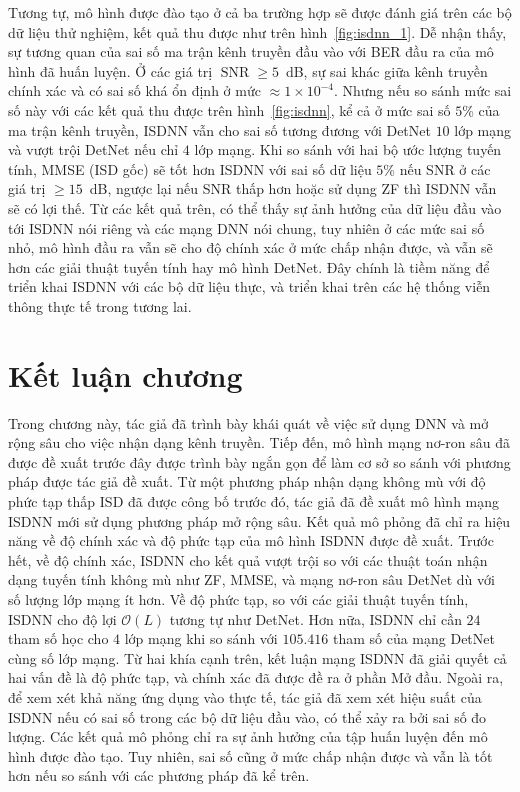 Tương tự, mô hình được đào tạo ở cả ba trường hợp sẽ được đánh giá trên các bộ dữ liệu thử nghiệm, kết quả thu được như trên hình~\ref{fig:isdnn_1}. Dễ nhận thấy, sự tương quan của sai số ma trận kênh truyền đầu vào với BER đầu ra của mô hình đã huấn luyện. Ở các giá trị $\operatorname{SNR}\ge 5$~dB, sự sai khác giữa kênh truyền chính xác và có sai số khá ổn định ở mức $\approx 1 \times 10^{-4}$. Nhưng nếu so sánh mức sai số này với các kết quả thu được trên hình~\ref{fig:isdnn}, kể cả ở mức sai số $5$\% của ma trận kênh truyền, ISDNN vẫn cho sai số tương đương với DetNet $10$ lớp mạng và vượt trội DetNet nếu chỉ $4$ lớp mạng. Khi so sánh với hai bộ ước lượng tuyến tính, MMSE (ISD gốc) sẽ tốt hơn ISDNN với sai số dữ liệu $5$\% nếu SNR ở các giá trị $\ge 15$~dB, ngược lại nếu SNR thấp hơn hoặc sử dụng ZF thì ISDNN vẫn sẽ có lợi thế. Từ các kết quả trên, có thể thấy sự ảnh hưởng của dữ liệu đầu vào tới ISDNN nói riêng và các mạng DNN nói chung, tuy nhiên ở các mức sai số nhỏ, mô hình đầu ra vẫn sẽ cho độ chính xác ở mức chấp nhận được, và vẫn sẽ hơn các giải thuật tuyến tính hay mô hình DetNet. Đây chính là tiềm năng để triển khai ISDNN với các bộ dữ liệu thực, và triển khai trên các hệ thống viễn thông thực tế trong tương lai.

\section{Kết luận chương}

Trong chương này, tác giả đã trình bày khái quát về việc sử dụng DNN và mở rộng sâu cho việc nhận dạng kênh truyền. Tiếp đến, mô hình mạng nơ-ron sâu đã được đề xuất trước đây được trình bày ngắn gọn để làm cơ sở so sánh với phương pháp được tác giả đề xuất. Từ một phương pháp nhận dạng không mù với độ phức tạp thấp ISD đã được công bố trước đó, tác giả đã đề xuất mô hình mạng ISDNN mới sử dụng phương pháp mở rộng sâu. Kết quả mô phỏng đã chỉ ra hiệu năng về độ chính xác và độ phức tạp của mô hình ISDNN được đề xuất. Trước hết, về độ chính xác, ISDNN cho kết quả vượt trội so với các thuật toán nhận dạng tuyến tính không mù như ZF, MMSE, và mạng nơ-ron sâu DetNet dù với số lượng lớp mạng ít hơn. Về độ phức tạp, so với các giải thuật tuyến tính, ISDNN cho độ lợi $\mathcal{O}(L)$ tương tự như DetNet. Hơn nữa, ISDNN chỉ cần $24$ tham số học cho $4$ lớp mạng khi so sánh với $105.416$ tham số của mạng DetNet cùng số lớp mạng. Từ hai khía cạnh trên, kết luận mạng ISDNN đã giải quyết cả hai vấn đề là độ phức tạp, và chính xác đã được đề ra ở phần Mở đầu. Ngoài ra, để xem xét khả năng ứng dụng vào thực tế, tác giả đã xem xét hiệu suất của ISDNN nếu có sai số trong các bộ dữ liệu đầu vào, có thể xảy ra bởi sai số đo lượng. Các kết quả mô phỏng chỉ ra sự ảnh hưởng của tập huấn luyện đến mô hình được đào tạo. Tuy nhiên, sai số cũng ở mức chấp nhận được và vẫn là tốt hơn nếu so sánh với các phương pháp đã kể trên. 